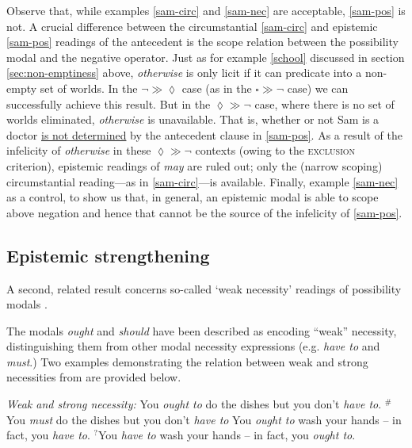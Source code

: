 Observe that, while examples \ref{sam-circ} and \ref{sam-nec} are acceptable, \ref{sam-pos} is not. A crucial difference between the circumstantial \ref{sam-circ} and epistemic \ref{sam-pos} readings of the antecedent is the scope relation between the possibility modal and the negative operator. Just as for example \ref{school} discussed in section \ref{sec:non-emptiness} above, \textit{otherwise} is only licit if it can predicate into a non-empty set of worlds. In the $ \neg\gg\lozenge $ case (as in the $ \square\gg\neg $ case) we can successfully achieve this result. But in the  $ \lozenge\gg\neg $ case, where there is no set of worlds eliminated, \textit{otherwise} is unavailable. That is, whether or not Sam is a doctor \ul{is not determined} by the antecedent clause in \ref{sam-pos}. As a result of the infelicity of \textit{otherwise} in these $ \lozenge\gg\neg $ contexts (owing to the \textsc{exclusion} criterion), epistemic readings of \textit{may} are ruled out; only the (narrow scoping) circumstantial reading---as in \ref{sam-circ}---is available. Finally, example \ref{sam-nec} as a control, to show us that, in general, an epistemic modal is able to scope above negation and hence that cannot be the source of the infelicity of \ref{sam-pos}.



\subsection{Epistemic strengthening} \label{sec:epistemic}


A second, related result concerns so-called `weak necessity' readings of possibility modals \citep{Rubinstein2012, VonFintel2008}.

The modals \textit{ought} and \textit{should} have been described as encoding ``weak'' necessity, distinguishing them from other modal necessity expressions (e.g. \textit{have to} and \textit{must}.) Two examples demonstrating the relation between weak and strong necessities from \citet[117]{VonFintel2008} are provided below.

\pex  \textit{Weak and strong necessity:}
\a  You \textit{ought to} do the dishes but you don't \textit{have to}.
\a  \hspace{-.35em}$ ^{\#} $You \textit{must} do the dishes but you don't \textit{have to}\xe
\pex  \a You \textit{ought to} wash your hands -- in fact, you \textit{have to}.
\a  \hspace{-.35em}$ ^{?} $You \textit{have to} wash your hands -- in fact, you \textit{ought to}.\xe

